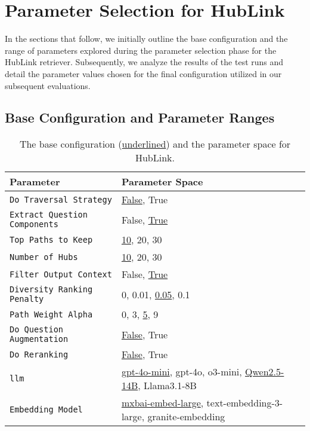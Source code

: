 
\section{Parameter Selection for HubLink}
\label{sec:param_selection_hublink}

In the sections that follow, we initially outline the base configuration and the range of parameters explored during the parameter selection phase for the HubLink retriever. Subsequently, we analyze the results of the test runs and detail the parameter values chosen for the final configuration utilized in our subsequent evaluations.

\subsection{Base Configuration and Parameter Ranges}

\begin{table}[t]
    \centering
    \begin{tabularx}{\textwidth}{l X}
        \toprule
        \textbf{Parameter} & \textbf{Parameter Space} \\
        \midrule
        \texttt{Do Traversal Strategy} & \underline{False}, True \\
        \texttt{Extract Question Components} & False, \underline{True} \\
        \texttt{Top Paths to Keep} & \underline{10}, 20, 30 \\
        \texttt{Number of Hubs} & \underline{10}, 20, 30 \\
        \texttt{Filter Output Context} & False, \underline{True} \\
        \texttt{Diversity Ranking Penalty} & 0, 0.01, \underline{0.05}, 0.1 \\
        \texttt{Path Weight Alpha} & 0, 3, \underline{5}, 9 \\
        \texttt{Do Question Augmentation} & \underline{False}, True \\
        \texttt{Do Reranking} & \underline{False}, True \\
        \texttt{\gls{llm}} & \underline{gpt-4o-mini}, gpt-4o, o3-mini, \underline{Qwen2.5-14B}, Llama3.1-8B \\
        \texttt{Embedding Model} & \underline{mxbai-embed-large}, text-embedding-3-large, granite-embedding \\
        \bottomrule
    \end{tabularx}
    \caption[Base Configuration and Parameter Space for HubLink]{The base configuration (\underline{underlined}) and the parameter space for HubLink.}
    \label{tab:hublink_tuning_configs}
\end{table}


